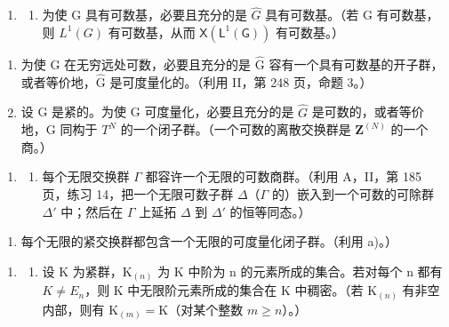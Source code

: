 
\begin{enumerate}
\def\labelenumi{\arabic{enumi})}
\tightlist
\item
  \begin{enumerate}
  \def\labelenumii{\alph{enumii})}
  \tightlist
  \item
    为使 G 具有可数基，必要且充分的是 \(\widehat{G}\) 具有可数基。（若 G 有可数基，则 \(L^{1}(G)\) 有可数基，从而 \(\mathsf{X}(\mathsf{L}^{1}(\mathsf{G}))\) 有可数基。）
  \end{enumerate}
\end{enumerate}

\begin{enumerate}
\def\labelenumi{\alph{enumi})}
\setcounter{enumi}{1}
\item
  为使 G 在无穷远处可数，必要且充分的是 \(\widehat{\mathrm{G}}\) 容有一个具有可数基的开子群，或者等价地，\(\widehat{\mathrm{G}}\) 是可度量化的。（利用 II，第 248 页，命题 3。）
\item
  设 G 是紧的。为使 G 可度量化，必要且充分的是 \(\widehat{G}\) 是可数的，或者等价地，G 同构于 \(T^{N}\) 的一个闭子群。（一个可数的离散交换群是 \(\mathbf{Z}^{(N)}\) 的一个商。）
\end{enumerate}

\begin{enumerate}
\def\labelenumi{\arabic{enumi})}
\setcounter{enumi}{1}
\tightlist
\item
  \begin{enumerate}
  \def\labelenumii{\alph{enumii})}
  \tightlist
  \item
    每个无限交换群 \(\Gamma\) 都容许一个无限的可数商群。（利用 A，II，第 185 页，练习 14，把一个无限可数子群 \(\Delta\)（\(\Gamma\) 的）嵌入到一个可数的可除群 \(\Delta'\) 中；然后在 \(\Gamma\) 上延拓 \(\Delta\) 到 \(\Delta'\) 的恒等同态。）
  \end{enumerate}
\end{enumerate}

\begin{enumerate}
\def\labelenumi{\alph{enumi})}
\setcounter{enumi}{1}
\tightlist
\item
  每个无限的紧交换群都包含一个无限的可度量化闭子群。（利用 a)。）
\end{enumerate}

\begin{enumerate}
\def\labelenumi{\arabic{enumi})}
\setcounter{enumi}{2}
\tightlist
\item
  \begin{enumerate}
  \def\labelenumii{\alph{enumii})}
  \tightlist
  \item
    设 K 为紧群，\(\mathrm{K}_{(n)}\) 为 K 中阶为 n 的元素所成的集合。若对每个 n 都有 \(K \neq E_{n}\)，则 K 中无限阶元素所成的集合在 K 中稠密。（若 \(\mathrm{K}_{(n)}\) 有非空内部，则有 \(\mathrm{K}_{(m)} = \mathrm{K}\)（对某个整数 \(m \geqslant n\)）。）
  \end{enumerate}
\end{enumerate}

